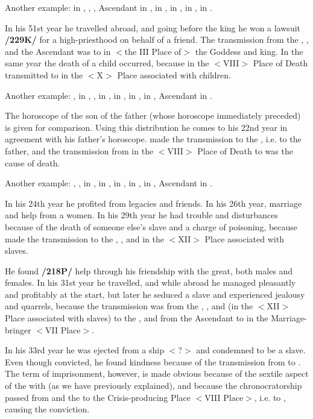 Another example: \Sun\xspace in \Taurus, \Moon, \Venus, Ascendant in \Aries, \Saturn\xspace in \Capricorn, \Jupiter\xspace in \Virgo, \Mars\xspace in \Scorpio, \Mercury\xspace in \Gemini. 

In his 51st year he travelled abroad, and going before the king he won a lawsuit \textbf{/229K/} for a high-priesthood on behalf of a friend. The transmission from the \Moon, \Venus, and the Ascendant was to \Mercury in $<$the III Place of$>$ the Goddess and king. In the same year the death of a child occurred, because \Mars\xspace in the $<$VIII$>$ Place of Death transmitted to \Saturn\xspace in the $<$X$>$ Place associated with children.

Another example: \Sun, \Mercury\xspace in \Scorpio, \Moon, \Mars\xspace in \Sagittarius, \Saturn\xspace in \Capricorn, \Jupiter\xspace in \Aquarius, \Venus\xspace in \Virgo, Ascendant in \Taurus. 

The horoscope of the son of the father (whose horoscope immediately preceded) is given for comparison. Using this distribution he comes to his 22nd year in agreement with his father’s horoscope. \Jupiter\xspace made the transmission to the \Sun, i.e. to the father, and the transmission from \Mars\xspace in the $<$VIII$>$ Place of Death to \Venus\xspace was the cause of death.

Another example: \Sun, \Mars, \Venus\xspace in \Leo, \Moon\xspace in \Aquarius, \Saturn\xspace in \Aries, \Jupiter\xspace in \Pisces,
\Mercury\xspace in \Cancer, Ascendant in \Virgo. 

In his 24th year he profited from legacies and friends. In his 26th
year, marriage and help from a women. In his 29th year he had trouble and disturbances because of the death of someone else’s slave and a charge of poisoning, because \Saturn\xspace made the transmission to the \Sun, \Mars, and \Venus\xspace in the $<$XII$>$ Place associated with slaves. 

He found \textbf{/218P/} help through his friendship with the great, both males and females. In his 31st year he travelled, and while abroad he managed pleasantly and profitably at the start, but later he seduced a slave and experienced jealousy and quarrels, because the transmission was from the \Sun, \Venus, and \Mars (in the $<$XII$>$ Place associated with slaves) to the \Moon, and from the Ascendant to \Jupiter\xspace in the Marriage-bringer $<$VII Place$>$. 

In his 33rd year he was ejected from a ship $<$?$>$ and condemned to be a slave. Even though convicted, he found kindness because
of the transmission from \Mercury\xspace to \Jupiter. The term of imprisonment, however, is made obvious because of the sextile aspect of the \Moon\xspace with \Saturn\xspace (as we have previously explained), and because the chronocratorship passed from \Mars\xspace and the \Sun to the Crisis-producing Place $<$VIII Place$>$, i.e. to \Saturn, causing the conviction. 

